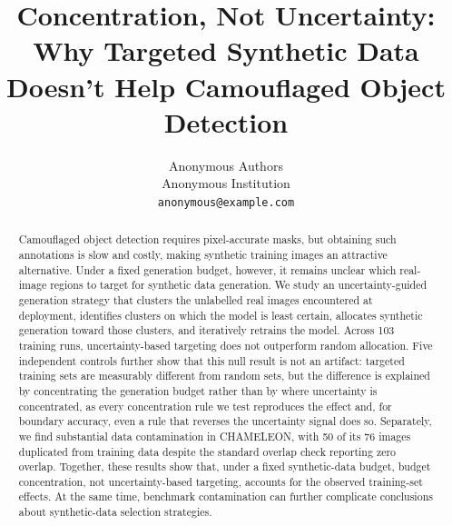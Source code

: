 \documentclass{article}
\title{Concentration, Not Uncertainty: Why Targeted Synthetic Data Doesn't Help Camouflaged Object Detection}
\author{Anonymous Authors \\
Anonymous Institution \\
\texttt{anonymous@example.com}
}
\begin{document}
\maketitle

\begin{abstract}
%

Camouflaged object detection requires pixel-accurate masks, but obtaining such annotations is slow and costly, making synthetic training images an attractive alternative. Under a fixed generation budget, however, it remains unclear which real-image regions to target for synthetic data generation. We study an uncertainty-guided generation strategy that clusters the unlabelled real images encountered at deployment, identifies clusters on which the model is least certain, allocates synthetic generation toward those clusters, and iteratively retrains the model. Across 103 training runs, uncertainty-based targeting does not outperform random allocation. Five independent controls further show that this null result is not an artifact: targeted training sets are measurably different from random sets, but the difference is explained by concentrating the generation budget rather than by where uncertainty is concentrated, as every concentration rule we test reproduces the effect and, for boundary accuracy, even a rule that reverses the uncertainty signal does so. Separately, we find substantial data contamination in CHAMELEON, with 50 of its 76 images duplicated from training data despite the standard overlap check reporting zero overlap. Together, these results show that, under a fixed synthetic-data budget, budget concentration, not uncertainty-based targeting, accounts for the observed training-set effects. At the same time, benchmark contamination can further complicate conclusions about synthetic-data selection strategies.
\end{abstract}
\end{document}
